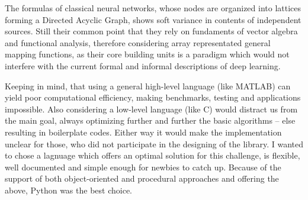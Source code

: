 The formulas of classical neural networks, whose nodes are organized into lattices forming a Directed Acyclic Graph, shows soft variance in contents of independent sources. Still their common point that they rely on fundaments of vector algebra and functional analysis, therefore considering array representated general mapping functions, as their core building units is a paradigm which would not interfere with the current formal and informal descriptions of deep learning.

Keeping in mind, that using a general high-level language (like MATLAB) can yield poor computational efficiency, making benchmarks, testing and applications impossible.
Also considering a low-level language (like C) would distract us from the main goal, always optimizing further and further the basic algorithms -- else resulting in boilerplate codes. Either way it would make the implementation unclear for those, who did not participate in the designing of the library.
I wanted to chose a lagnuage which offers an optimal solution for this challenge, is flexible, well documented and simple enough for newbies to catch up.
Because of the support of both object-oriented and procedural approaches and offering the above, Python was the best choice.

